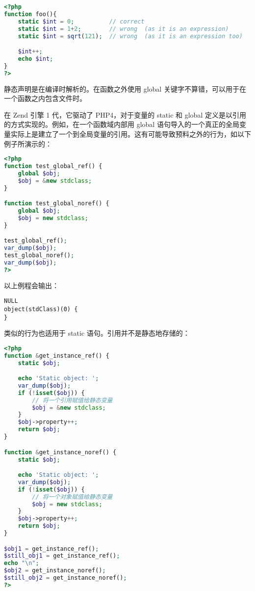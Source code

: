 \begin{lstlisting}[language=PHP]
<?php
function foo(){
    static $int = 0;          // correct
    static $int = 1+2;        // wrong  (as it is an expression)
    static $int = sqrt(121);  // wrong  (as it is an expression too)

    $int++;
    echo $int;
}
?>
\end{lstlisting}

静态声明是在编译时解析的。在函数之外使用 global 关键字不算错，可以用于在一个函数之内包含文件时。

在 Zend 引擎 1 代，它驱动了 PHP4，对于变量的 static 和 global 定义是以引用的方式实现的。例如，在一个函数域内部用 global 语句导入的一个真正的全局变量实际上是建立了一个到全局变量的引用。这有可能导致预料之外的行为，如以下例子所演示的：

\begin{lstlisting}[language=PHP]
<?php
function test_global_ref() {
    global $obj;
    $obj = &new stdclass;
}

function test_global_noref() {
    global $obj;
    $obj = new stdclass;
}

test_global_ref();
var_dump($obj);
test_global_noref();
var_dump($obj);
?>
\end{lstlisting}

以上例程会输出：

\begin{verbatim}
NULL
object(stdClass)(0) {
}
\end{verbatim}

类似的行为也适用于 static 语句。引用并不是静态地存储的：

\begin{lstlisting}[language=PHP]
<?php
function &get_instance_ref() {
    static $obj;

    echo 'Static object: ';
    var_dump($obj);
    if (!isset($obj)) {
        // 将一个引用赋值给静态变量
        $obj = &new stdclass;
    }
    $obj->property++;
    return $obj;
}

function &get_instance_noref() {
    static $obj;

    echo 'Static object: ';
    var_dump($obj);
    if (!isset($obj)) {
        // 将一个对象赋值给静态变量
        $obj = new stdclass;
    }
    $obj->property++;
    return $obj;
}

$obj1 = get_instance_ref();
$still_obj1 = get_instance_ref();
echo "\n";
$obj2 = get_instance_noref();
$still_obj2 = get_instance_noref();
?>
\end{lstlisting}

